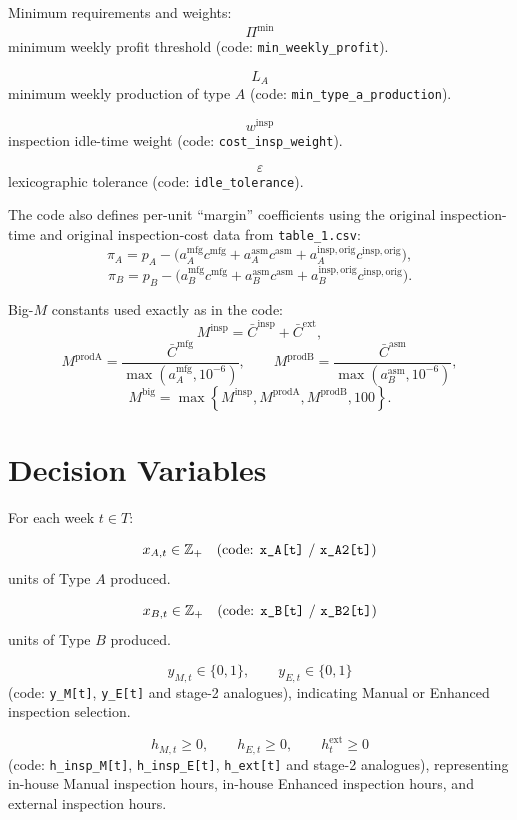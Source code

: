 Minimum requirements and weights:
\[
\Pi^{\min}
\]
minimum weekly profit threshold (code: \texttt{min\_weekly\_profit}).

\[
L_A
\]
minimum weekly production of type \(A\) (code: \texttt{min\_type\_a\_production}).

\[
w^{\mathrm{insp}}
\]
inspection idle-time weight (code: \texttt{cost\_insp\_weight}).

\[
\varepsilon
\]
lexicographic tolerance (code: \texttt{idle\_tolerance}).

The code also defines per-unit ``margin'' coefficients using the original inspection-time and original inspection-cost data from \texttt{table\_1.csv}:
\[
\pi_A = p_A - \Big(a_A^{\mathrm{mfg}} c^{\mathrm{mfg}} + a_A^{\mathrm{asm}} c^{\mathrm{asm}} + a_{A}^{\mathrm{insp,orig}} c^{\mathrm{insp,orig}}\Big),
\]
\[
\pi_B = p_B - \Big(a_B^{\mathrm{mfg}} c^{\mathrm{mfg}} + a_B^{\mathrm{asm}} c^{\mathrm{asm}} + a_{B}^{\mathrm{insp,orig}} c^{\mathrm{insp,orig}}\Big).
\]

Big-\(M\) constants used exactly as in the code:
\[
M^{\mathrm{insp}}=\bar C^{\mathrm{insp}}+\bar C^{\mathrm{ext}},
\]
\[
M^{\mathrm{prodA}}=\frac{\bar C^{\mathrm{mfg}}}{\max(a_A^{\mathrm{mfg}},10^{-6})},\qquad
M^{\mathrm{prodB}}=\frac{\bar C^{\mathrm{asm}}}{\max(a_B^{\mathrm{asm}},10^{-6})},
\]
\[
M^{\mathrm{big}}=\max\left\{M^{\mathrm{insp}},M^{\mathrm{prodA}},M^{\mathrm{prodB}},100\right\}.
\]

\section*{Decision Variables}

For each week \(t\in T\):

\[
x_{A,t}\in \mathbb Z_+ \quad \text{(code: \texttt{x\_A[t]} / \texttt{x\_A2[t]})}
\]
units of Type \(A\) produced.

\[
x_{B,t}\in \mathbb Z_+ \quad \text{(code: \texttt{x\_B[t]} / \texttt{x\_B2[t]})}
\]
units of Type \(B\) produced.

\[
y_{M,t}\in\{0,1\},\qquad y_{E,t}\in\{0,1\}
\]
(code: \texttt{y\_M[t]}, \texttt{y\_E[t]} and stage-2 analogues), indicating Manual or Enhanced inspection selection.

\[
h_{M,t}\ge 0,\qquad h_{E,t}\ge 0,\qquad h^{\mathrm{ext}}_t\ge 0
\]
(code: \texttt{h\_insp\_M[t]}, \texttt{h\_insp\_E[t]}, \texttt{h\_ext[t]} and stage-2 analogues), representing in-house Manual inspection hours, in-house Enhanced inspection hours, and external inspection hours.

